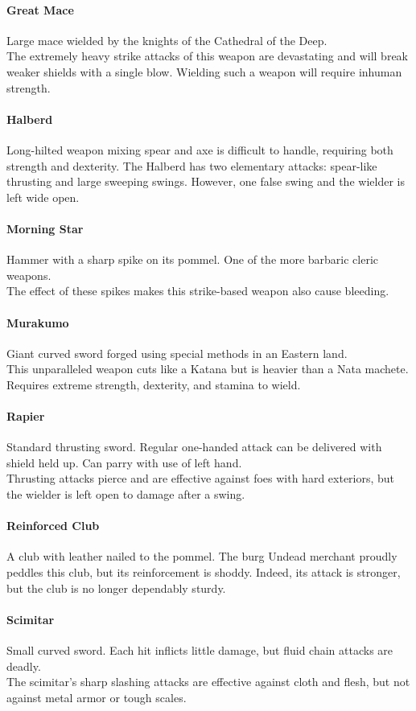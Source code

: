 \documentclass[twocolumn,a4paper]{article}
\begin{document}
\paragraph{Great Mace}
Large mace wielded by the knights of the Cathedral of the Deep.\\
The extremely heavy strike attacks of this weapon are devastating and will break weaker shields with a single blow. Wielding such a weapon will require inhuman strength.
\paragraph{Halberd}
Long-hilted weapon mixing spear and axe is difficult to handle, requiring both strength and dexterity. The Halberd has two elementary attacks: spear-like thrusting and large sweeping swings. However, one false swing and the wielder is left wide open.
\paragraph{Morning Star}
Hammer with a sharp spike on its pommel. One of the more barbaric cleric weapons.\\
The effect of these spikes makes this strike-based weapon also cause bleeding.
\paragraph{Murakumo}
Giant curved sword forged using special methods in an Eastern land.\\
This unparalleled weapon cuts like a Katana but is heavier than a Nata machete. Requires extreme strength, dexterity, and stamina to wield.
\paragraph{Rapier}
Standard thrusting sword. Regular one-handed attack can be delivered with shield held up. Can parry with use of left hand.\\
Thrusting attacks pierce and are effective against foes with hard exteriors, but the wielder is left open to damage after a swing.
\paragraph{Reinforced Club}
A club with leather nailed to the pommel. The burg Undead merchant proudly peddles this club, but its reinforcement is shoddy. Indeed, its attack is stronger, but the club is no longer dependably sturdy.
\paragraph{Scimitar}
Small curved sword. Each hit inflicts little damage, but fluid chain attacks are deadly.\\
The scimitar's sharp slashing attacks are effective against cloth and flesh, but not against metal armor or tough scales.
\end{document}
